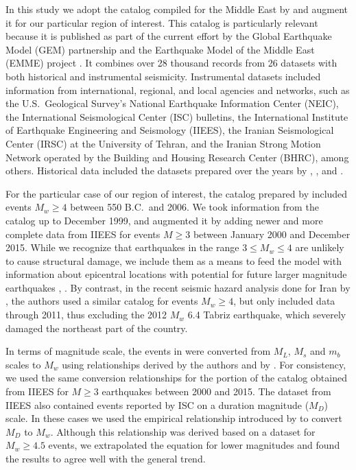 In this study we adopt the catalog compiled for the Middle East by \citet{Zare2014} and augment it for our particular region of interest. This catalog is particularly relevant because it is published as part of the current effort by the Global Earthquake Model (GEM) partnership and the Earthquake Model of the Middle East (EMME) project . It combines over 28 thousand records from 26 datasets with both historical and instrumental seismicity. Instrumental datasets included information from international, regional, and local agencies and networks, such as the U.S.~Geological Survey's National Earthquake Information Center (NEIC), the International Seismological Center (ISC) bulletins, the International Institute of Earthquake Engineering and Seismology (IIEES), the Iranian Seismological Center (IRSC) at the University of Tehran, and the Iranian Strong Motion Network operated by the Building and Housing Research Center (BHRC), among others. Historical data included the datasets prepared over the years by \citet{Ambraseys_1982_Book}, \citet{Ambraseys_2005_Book}, and \citet{Ambraseys_2009_Book}.

For the particular case of our region of interest, the catalog prepared by \citet{Zare2014} included events $M_w \geq 4$ between 550 B.C.~and 2006. We took information from the catalog up to December 1999, and augmented it by adding newer and more complete data from IIEES for events $M \geq 3$ between January 2000 and December 2015. While we recognize that earthquakes in the range $3 \leq M_w \leq 4$ are unlikely to cause structural damage, we include them as a means to feed the model with information about epicentral locations with potential for future larger magnitude earthquakes \citep{Kafka_2000_BSSA}, . By contrast, in the recent seismic hazard analysis done for Iran by \citet{Khodaverdian_2016_BSSA}, the authors used a similar catalog for events $M_w \geq 4$, but only included data through 2011, thus excluding the 2012 $M_w$ 6.4 Tabriz earthquake, which severely damaged the northeast part of the country.

In terms of magnitude scale, the events in \citet{Zare2014} were converted from $M_L$, $M_s$ and $m_b$ scales to $M_w$ using relationships derived by the authors and by \citet{Escordilis_2006_JS}. For consistency, we used the same conversion relationships for the portion of the catalog obtained from IIEES for $M \geq 3$ earthquakes between 2000 and 2015. The dataset from IIEES also contained events reported by ISC on a duration magnitude ($M_D$) scale. In these cases we used the empirical relationship introduced by \citet{Deniz2010} to convert $M_D$ to $M_w$. Although this relationship was derived based on a dataset for $M_w \geq 4.5$ events, we extrapolated the equation for lower magnitudes and found the results to agree well with the general trend.

